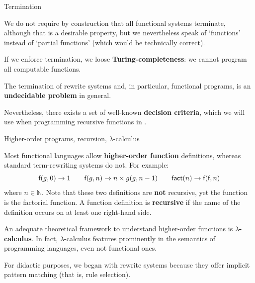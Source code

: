 %
\begin{frame}{Termination}

  \label{termination2}

  We do not require by construction that all functional systems
  terminate, although that is a desirable property, but we
  nevertheless speak of `functions' instead of `partial functions'
  (which would be technically correct).

  \bigskip

  If we enforce termination, we loose
  \textbf{Turing\hyp{}completeness}: we cannot program all computable
  functions.

  \bigskip

  The termination of rewrite systems and, in particular, functional
  programs, is an \textbf{undecidable problem} in general.

  \bigskip

  Nevertheless, there exists a set of well\hyp{}known \textbf{decision
    criteria}, which we will use when programming recursive functions
  in \OCaml.

\end{frame}

%
\begin{frame}{Higher-order programs, recursion, $\lambda$-calculus}

  Most functional languages allow \textbf{higher\hyp{}order function}
  definitions, whereas standard term\hyp{}rewriting systems do
  not. For example:
  \begin{equation*}
    \textsf{f}(g,0) \rightarrow 1
    \qquad
    \textsf{f}(g,n) \rightarrow n \times g(g,n-1)
    \qquad
    \textsf{fact}(n) \rightarrow \textsf{f}(\textsf{f},n)
  \end{equation*}
  where \(n \in \mathbb{N}\). Note that these two definitions are
  \textbf{not} recursive, yet the function  is the factorial
  function. A function definition is \textbf{recursive} if the name of
  the definition occurs on at least one right\hyp{}hand side.

  \bigskip

  An adequate theoretical framework to understand higher\hyp{}order
  functions is \textbf{\(\lambda\)-calculus}. In fact,
  \(\lambda\)-calculus features prominently in the semantics of
  programming languages, even not functional ones.

  \bigskip

  For didactic purposes, we began with rewrite systems because they
  offer implicit pattern matching (that is, rule selection).

\end{frame}
